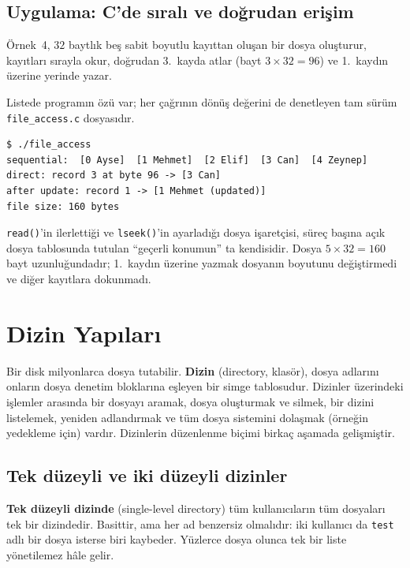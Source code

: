 \documentclass[11pt,a4paper]{article}
\newcommand{\term}[1]{\textbf{\color{mintdeep}#1}}
\newcommand{\cmd}[1]{\texttt{#1}}
\begin{document}
\subsection{Uygulama: C'de sıralı ve doğrudan erişim}

Örnek~4, $32$ baytlık beş sabit boyutlu kayıttan oluşan bir dosya oluşturur, kayıtları sırayla okur, doğrudan 3.\ kayda atlar (bayt $3 \times 32 = 96$) ve 1.\ kaydın üzerine yerinde yazar.

Listede programın özü var; her çağrının dönüş değerini de denetleyen tam sürüm \cmd{file\_access.c} dosyasıdır.



\begin{lstlisting}[style=term]
$ ./file_access
sequential:  [0 Ayse]  [1 Mehmet]  [2 Elif]  [3 Can]  [4 Zeynep]
direct: record 3 at byte 96 -> [3 Can]
after update: record 1 -> [1 Mehmet (updated)]
file size: 160 bytes
\end{lstlisting}

\cmd{read()}'in ilerlettiği ve \cmd{lseek()}'in ayarladığı dosya işaretçisi, süreç başına açık dosya tablosunda tutulan ``geçerli konumun'' ta kendisidir. Dosya $5 \times 32 = 160$ bayt uzunluğundadır; 1.\ kaydın üzerine yazmak dosyanın boyutunu değiştirmedi ve diğer kayıtlara dokunmadı.

\section{Dizin Yapıları}

Bir disk milyonlarca dosya tutabilir. \term{Dizin} (directory, klasör), dosya adlarını onların dosya denetim bloklarına eşleyen bir simge tablosudur. Dizinler üzerindeki işlemler arasında bir dosyayı aramak, dosya oluşturmak ve silmek, bir dizini listelemek, yeniden adlandırmak ve tüm dosya sistemini dolaşmak (örneğin yedekleme için) vardır. Dizinlerin düzenlenme biçimi birkaç aşamada gelişmiştir.

\subsection{Tek düzeyli ve iki düzeyli dizinler}

\term{Tek düzeyli dizinde} (single-level directory) tüm kullanıcıların tüm dosyaları tek bir dizindedir. Basittir, ama her ad benzersiz olmalıdır: iki kullanıcı da \texttt{test} adlı bir dosya isterse biri kaybeder. Yüzlerce dosya olunca tek bir liste yönetilemez hâle gelir.
\end{document}
